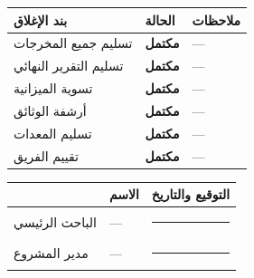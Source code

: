 \documentclass[11pt,a4paper]{article}
\begin{document}
\begin{table}[H]
\centering
\renewcommand{\arraystretch}{1.5}
\begin{tabularx}{\textwidth}{L{6cm} C{3cm} X}
\toprule
\textbf{بند الإغلاق} & \textbf{الحالة} & \textbf{ملاحظات} \\
\midrule
تسليم جميع المخرجات & \color{goodColor}\textbf{مكتمل} & --- \\
تسليم التقرير النهائي & \color{goodColor}\textbf{مكتمل} & --- \\
تسوية الميزانية & \color{goodColor}\textbf{مكتمل} & --- \\
أرشفة الوثائق & \color{goodColor}\textbf{مكتمل} & --- \\
تسليم المعدات & \color{goodColor}\textbf{مكتمل} & --- \\
تقييم الفريق & \color{goodColor}\textbf{مكتمل} & --- \\
\bottomrule
\end{tabularx}
\end{table}

\vspace{2em}

\begin{table}[H]
\centering
\renewcommand{\arraystretch}{2}
\begin{tabularx}{\textwidth}{L{4cm} X X}
\toprule
& \textbf{الاسم} & \textbf{التوقيع والتاريخ} \\
\midrule
الباحث الرئيسي & --- & \rule{5cm}{0.4pt} \\
مدير المشروع & --- & \rule{5cm}{0.4pt} \\
\bottomrule
\end{tabularx}
\end{table}
\end{document}
